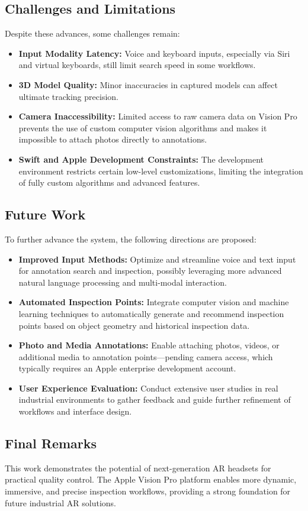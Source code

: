 \subsection{Challenges and Limitations}
Despite these advances, some challenges remain:
\begin{itemize}
    \item \textbf{Input Modality Latency:} Voice and keyboard inputs, especially via Siri and virtual keyboards, still limit search speed in some workflows.
    \item \textbf{3D Model Quality:} Minor inaccuracies in captured models can affect ultimate tracking precision.
    \item \textbf{Camera Inaccessibility:} Limited access to raw camera data on Vision Pro prevents the use of custom computer vision algorithms and makes it impossible to attach photos directly to annotations.
    \item \textbf{Swift and Apple Development Constraints:} The development environment restricts certain low-level customizations, limiting the integration of fully custom algorithms and advanced features.
\end{itemize}


\subsection{Future Work}
To further advance the system, the following directions are proposed:
\begin{itemize}
    \item \textbf{Improved Input Methods:} Optimize and streamline voice and text input for annotation search and inspection, possibly leveraging more advanced natural language processing and multi-modal interaction.
    \item \textbf{Automated Inspection Points:} Integrate computer vision and machine learning techniques to automatically generate and recommend inspection points based on object geometry and historical inspection data.
    \item \textbf{Photo and Media Annotations:} Enable attaching photos, videos, or additional media to annotation points—pending camera access, which typically requires an Apple enterprise development account.
    \item \textbf{User Experience Evaluation:} Conduct extensive user studies in real industrial environments to gather feedback and guide further refinement of workflows and interface design.
\end{itemize}


\subsection{Final Remarks}
This work demonstrates the potential of next-generation AR headsets for practical quality control. The Apple Vision Pro platform enables more dynamic, immersive, and precise inspection workflows, providing a strong foundation for future industrial AR solutions.
